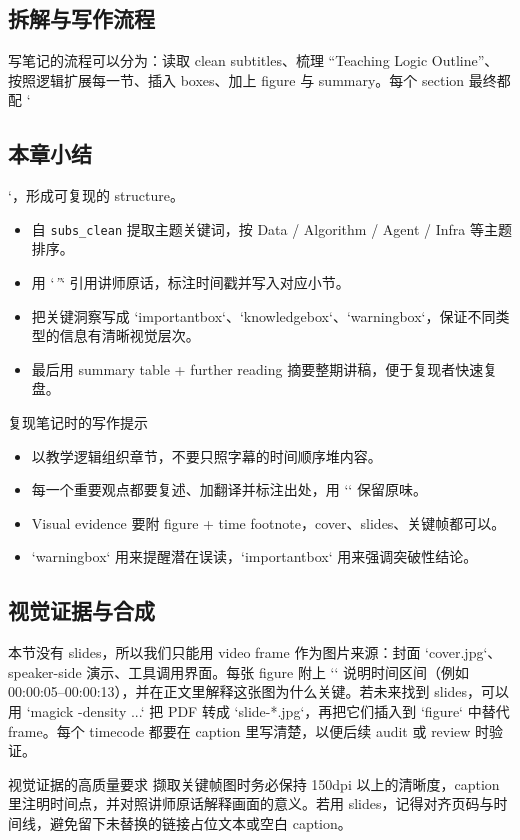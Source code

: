 \subsection{拆解与写作流程}
写笔记的流程可以分为：读取 clean subtitles、梳理 ``Teaching Logic Outline''、按照逻辑扩展每一节、插入 boxes、加上 figure 与 summary。每个 section 最终都配 `\subsection{本章小结}`，形成可复现的 structure。
\begin{itemize}
    \item 自 \texttt{subs\_clean} 提取主题关键词，按 Data / Algorithm / Agent / Infra 等主题排序。
    \item 用 `\textit{''}` 引用讲师原话，标注时间戳并写入对应小节。
    \item 把关键洞察写成 `importantbox`、`knowledgebox`、`warningbox`，保证不同类型的信息有清晰视觉层次。
    \item 最后用 summary table + further reading 摘要整期讲稿，便于复现者快速复盘。
\end{itemize}
\begin{knowledgebox}{复现笔记时的写作提示}
\begin{itemize}
    \item 以教学逻辑组织章节，不要只照字幕的时间顺序堆内容。
    \item 每一个重要观点都要复述、加翻译并标注出处，用 `\textit{}` 保留原味。
    \item Visual evidence 要附 figure + time footnote，cover、slides、关键帧都可以。
    \item `warningbox` 用来提醒潜在误读，`importantbox` 用来强调突破性结论。
\end{itemize}
\end{knowledgebox}

\subsection{视觉证据与合成}
本节没有 slides，所以我们只能用 video frame 作为图片来源：封面 `cover.jpg`、speaker-side 演示、工具调用界面。每张 figure 附上 `\protect\footnotemark` 说明时间区间（例如 00:00:05--00:00:13），并在正文里解释这张图为什么关键。若未来找到 slides，可以用 `magick -density ...` 把 PDF 转成 `slide-*.jpg`，再把它们插入到 `figure` 中替代 frame。每个 timecode 都要在 caption 里写清楚，以便后续 audit 或 review 时验证。

\begin{importantbox}{视觉证据的高质量要求}
撷取关键帧图时务必保持 150dpi 以上的清晰度，caption 里注明时间点，并对照讲师原话解释画面的意义。若用 slides，记得对齐页码与时间线，避免留下未替换的链接占位文本或空白 caption。
\end{importantbox}

